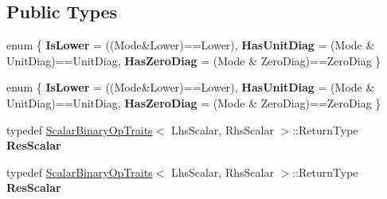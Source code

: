 \subsection*{Public Types}
\begin{DoxyCompactItemize}
\item 
\mbox{\label{struct_eigen_1_1internal_1_1triangular__matrix__vector__product_3_01_index_00_01_mode_00_01_lhs_ba3c1ba3cb379196807b17d99fce4e08_ad976710bcb1e7d2b539135b5edf6ac6d}} 
enum \{ {\bfseries Is\+Lower} = ((Mode\&Lower)==Lower), 
{\bfseries Has\+Unit\+Diag} = (Mode \& Unit\+Diag)==Unit\+Diag, 
{\bfseries Has\+Zero\+Diag} = (Mode \& Zero\+Diag)==Zero\+Diag
 \}
\item 
\mbox{\label{struct_eigen_1_1internal_1_1triangular__matrix__vector__product_3_01_index_00_01_mode_00_01_lhs_ba3c1ba3cb379196807b17d99fce4e08_a64034ee7d5c50588d932c6abb1acc551}} 
enum \{ {\bfseries Is\+Lower} = ((Mode\&Lower)==Lower), 
{\bfseries Has\+Unit\+Diag} = (Mode \& Unit\+Diag)==Unit\+Diag, 
{\bfseries Has\+Zero\+Diag} = (Mode \& Zero\+Diag)==Zero\+Diag
 \}
\item 
\mbox{\label{struct_eigen_1_1internal_1_1triangular__matrix__vector__product_3_01_index_00_01_mode_00_01_lhs_ba3c1ba3cb379196807b17d99fce4e08_a0f6da624122e56e803917b9be1e36fc3}} 
typedef \hyperlink{group___core___module_struct_eigen_1_1_scalar_binary_op_traits}{Scalar\+Binary\+Op\+Traits}$<$ Lhs\+Scalar, Rhs\+Scalar $>$\+::Return\+Type {\bfseries Res\+Scalar}
\item 
\mbox{\label{struct_eigen_1_1internal_1_1triangular__matrix__vector__product_3_01_index_00_01_mode_00_01_lhs_ba3c1ba3cb379196807b17d99fce4e08_a0f6da624122e56e803917b9be1e36fc3}} 
typedef \hyperlink{group___core___module_struct_eigen_1_1_scalar_binary_op_traits}{Scalar\+Binary\+Op\+Traits}$<$ Lhs\+Scalar, Rhs\+Scalar $>$\+::Return\+Type {\bfseries Res\+Scalar}
\end{DoxyCompactItemize}
